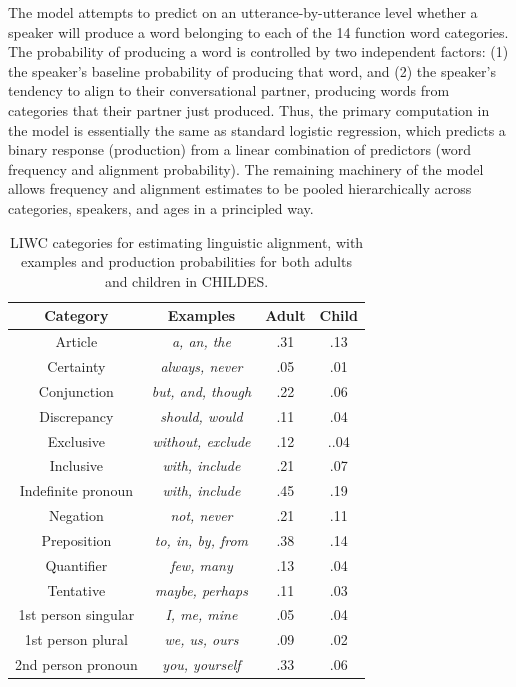 \documentclass[10pt,letterpaper]{article}
\begin{document}
The model attempts to predict on an utterance-by-utterance level whether a speaker will produce a word belonging to each of the 14 function word categories. The probability of producing a word is controlled by two independent factors: (1) the speaker's baseline probability of producing that word, and (2) the speaker's tendency to align to their conversational partner, producing words from categories that their partner just produced. Thus, the primary computation in the model is essentially the same as standard logistic regression, which predicts a binary response (production) from a linear combination of predictors (word frequency and alignment probability). The remaining machinery of the model allows frequency and alignment estimates to be pooled hierarchically across categories, speakers, and ages in a principled way.

\begin{table}[tb]
\centering
\begin{tabular}{|c|c|c|c|} \hline
Category & Examples & Adult & Child\\ \hline
Article & \textit{a, an, the} & .31 & .13 \\
Certainty  & \textit{always, never} & .05 & .01 \\
Conjunction  & \textit{but, and, though} & .22 & .06\\
Discrepancy  & \textit{should, would} & .11 & .04 \\
Exclusive  & \textit{without, exclude} & .12 & ..04\\
Inclusive  & \textit{with, include} & .21 & .07\\
Indefinite pronoun & \textit{with, include} & .45 & .19\\
Negation   & \textit{not, never} & .21 & .11\\
Preposition& \textit{to, in, by, from}  & .38 & .14\\
Quantifier   & \textit{few, many} & .13 & .04\\
Tentative & \textit{maybe, perhaps} & .11 & .03\\
1st person singular  & \textit{I, me, mine} & .05 & .04\\
1st person plural & \textit{we, us, ours} & .09 & .02\\
2nd person pronoun   & \textit{you, yourself} & .33 & .06\\
\hline
\end{tabular}
\caption{LIWC categories for estimating linguistic alignment, with examples and production probabilities for both adults and children in CHILDES.}\label{tab:LIWC}
\end{table}
\end{document}
